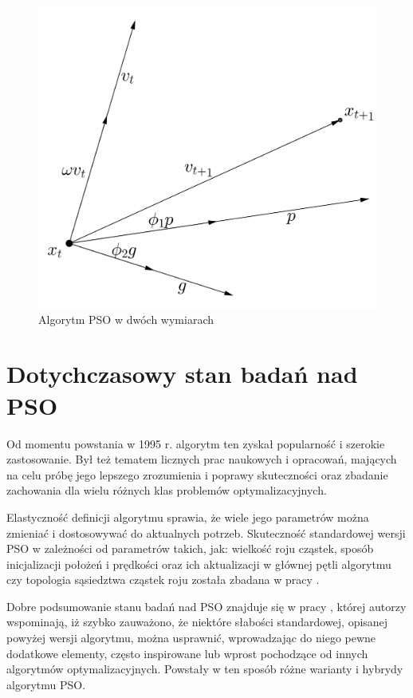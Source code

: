 \documentclass[12pt, twoside, openany, abstract=on]{report}
\theoremstyle{definition}
\begin{document}
\begin{figure}[H]
    \centering
 \includegraphics[scale=0.2]{PSO2D.png}
 \caption{Algorytm PSO w dwóch wymiarach}
\end{figure}

\section{Dotychczasowy stan badań nad PSO}

Od momentu powstania w 1995 r. algorytm ten zyskał popularność i szerokie zastosowanie. Był też tematem licznych prac naukowych i opracowań, mających na celu próbę jego lepszego zrozumienia i poprawy skuteczności oraz zbadanie zachowania dla wielu różnych klas problemów optymalizacyjnych.

Elastyczność definicji algorytmu sprawia, że wiele jego parametrów można zmieniać i dostosowywać do aktualnych potrzeb. Skuteczność standardowej wersji PSO w zależności od parametrów takich, jak: wielkość roju cząstek, sposób inicjalizacji położeń i prędkości oraz ich aktualizacji w głównej pętli algorytmu czy topologia sąsiedztwa cząstek roju została zbadana w pracy \cite{SPso}. 

Dobre podsumowanie stanu badań nad PSO znajduje się w pracy \cite{ComprLearnPso}, której autorzy wspominają, iż szybko zauważono, że niektóre słabości standardowej, opisanej powyżej wersji algorytmu, można usprawnić, wprowadzając do niego pewne dodatkowe elementy, często inspirowane lub wprost pochodzące od innych algorytmów optymalizacyjnych. Powstały w ten sposób różne warianty i hybrydy algorytmu PSO.
\end{document}
